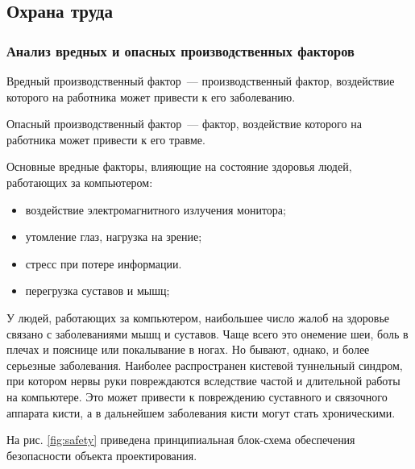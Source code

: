 \subsection{Охрана труда}
\subsubsection{Анализ вредных и опасных производственных факторов}
Вредный производственный фактор~--- производственный фактор, воздействие которого на работника может привести к его заболеванию.

Опасный производственный фактор~--- фактор, воздействие которого на работника может привести к его травме.

Основные вредные факторы, влияющие на состояние здоровья людей, работающих за компьютером:
\begin{itemize}
  \item{воздействие электромагнитного излучения монитора;}
  \item{утомление глаз, нагрузка на зрение;}
  \item{стресс при потере информации.}
  \item{перегрузка суставов и мышц;}
\end{itemize}

У людей, работающих за компьютером, наибольшее число жалоб на здоровье связано с заболеваниями мышц и суставов.
Чаще всего это онемение шеи, боль в плечах и пояснице или покалывание в ногах.
Но бывают, однако, и более серьезные заболевания.
Наиболее распространен кистевой туннельный синдром, при котором нервы руки повреждаются вследствие частой и длительной работы на компьютере.
Это может привести к повреждению суставного и связочного аппарата кисти, а в дальнейшем заболевания кисти могут стать хроническими.

На рис. \ref{fig:safety} приведена принципиальная блок-схема обеспечения безопасности объекта проектирования.

